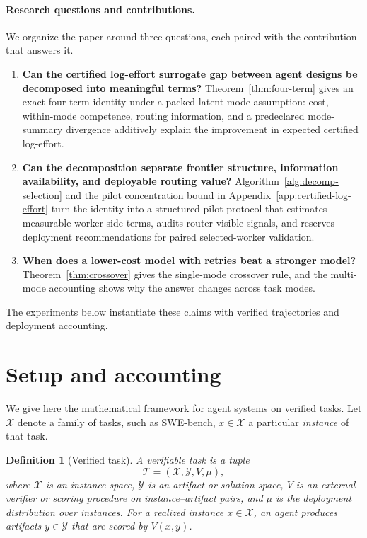 \documentclass{article}
\newtheorem{definition}{Definition}
\begin{document}
\paragraph{Research questions and contributions.}
We organize the paper around three questions, each paired with the contribution that answers it.

\begin{enumerate}[leftmargin=1.4em,itemsep=0.15em]
  \item \textbf{Can the certified log-effort surrogate gap between agent designs be decomposed into meaningful terms?}
  Theorem~\ref{thm:four-term} gives an exact four-term identity under a packed latent-mode assumption: cost, within-mode competence, routing information, and a predeclared mode-summary divergence additively explain the improvement in expected certified log-effort.
  \item \textbf{Can the decomposition separate frontier structure, information availability, and deployable routing value?}
  Algorithm~\ref{alg:decomp-selection} and the pilot concentration bound in Appendix~\ref{app:certified-log-effort} turn the identity into a structured pilot protocol that estimates measurable worker-side terms, audits router-visible signals, and reserves deployment recommendations for paired selected-worker validation.
  \item \textbf{When does a lower-cost model with retries beat a stronger model?}
  Theorem~\ref{thm:crossover} gives the single-mode crossover rule, and the multi-mode accounting shows why the answer changes across task modes.
\end{enumerate}

The experiments below instantiate these claims with verified trajectories and deployment accounting.

\section{Setup and accounting}
\label{sec:framework}

We give here the mathematical framework for agent systems on verified tasks. Let \(\mathcal X\) denote a family of tasks, such as
SWE-bench, \(x\in\mathcal X\) a particular \textit{instance} of that task.

\begin{definition}[Verified task]
\label{def:verified-task}
A verifiable task is a tuple
\[
\mathcal T=(\mathcal X,\mathcal Y,V,\mu),
\]
where $\mathcal X$ is an instance space, $\mathcal Y$ is an artifact or solution space,
$V$ is an external verifier or scoring procedure on instance--artifact pairs, and
$\mu$ is the deployment distribution over instances.
For a realized instance $x\in\mathcal X$, an agent produces artifacts $y\in\mathcal Y$ that are scored by $V(x,y)$.
\end{definition}
\end{document}
